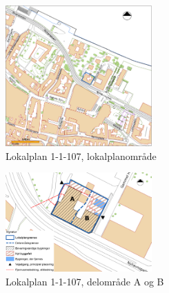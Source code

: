 \begin{figure}[htbp]
	\centering
	\includegraphics[width=0.5\textwidth]{billeder/nylokalplanoversigt.png}
	\caption{Lokalplan 1-1-107, lokalplanområde}
	\label{fig:1-1-107}
\end{figure}

\begin{figure}[htbp]
	\centering
	\includegraphics[width=0.5\textwidth]{billeder/signatur.png}
	\caption{Lokalplan 1-1-107, delområde A og B}
	\label{fig:aogb}
\end{figure}

